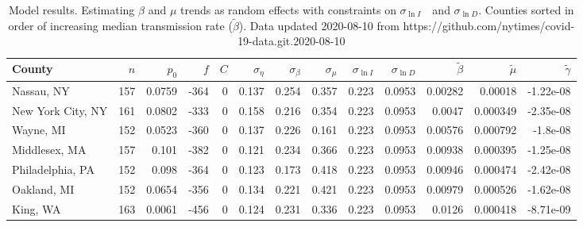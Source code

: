 \documentclass[12pt,letterpaper]{article}
\newcommand\slI{$\sigma_{\ln I}$\ }
\newcommand\slD{$\sigma_{\ln D}$}
\begin{document}
{\begin{appendices}
\begin{sidewaystable}
{%
}\end{sidewaystable}




\begin{sidewaystable}
\caption{\label{tab:cons}
Model results. Estimating $\beta$ and $\mu$ trends as random effects with 
constraints on \slI\  and \slD.
Counties sorted in order of increasing median transmission rate ($\tilde\beta$).
Data updated 2020-08-10 from https://github.com/nytimes/covid-19-data.git.2020-08-10
}
\centering
{\scriptsize

\begin{tabular}{lrrrrrrrrrrrr}
\hline
 County             &   $n$ &   $p_0$ &    $f$ &   $C$ &   $\sigma_\eta$ &   $\sigma_\beta$ &   $\sigma_\mu$ &   $\sigma_{\ln I}$ &   $\sigma_{\ln D}$ &   $\tilde{\beta}$ &   $\tilde{\mu}$ &   $\tilde\gamma$ \\
\hline
 Nassau, NY         & 157   & 0.0759  & -364   &     0 &          0.137  &           0.254  &         0.357  &              0.223 &             0.0953 &           0.00282 &        0.00018  &       -1.22e-08  \\
 New York City, NY  & 161   & 0.0802  & -333   &     0 &          0.158  &           0.216  &         0.354  &              0.223 &             0.0953 &           0.0047  &        0.000349 &       -2.35e-08  \\
 Wayne, MI          & 152   & 0.0523  & -360   &     0 &          0.137  &           0.226  &         0.161  &              0.223 &             0.0953 &           0.00576 &        0.000792 &       -1.8e-08   \\
 Middlesex, MA      & 157   & 0.101   & -382   &     0 &          0.121  &           0.234  &         0.366  &              0.223 &             0.0953 &           0.00938 &        0.000395 &       -1.25e-08  \\
 Philadelphia, PA   & 152   & 0.098   & -364   &     0 &          0.123  &           0.173  &         0.418  &              0.223 &             0.0953 &           0.00946 &        0.000474 &       -2.42e-08  \\
 Oakland, MI        & 152   & 0.0654  & -356   &     0 &          0.134  &           0.221  &         0.421  &              0.223 &             0.0953 &           0.00979 &        0.000526 &       -1.62e-08  \\
 King, WA           & 163   & 0.0061  & -456   &     0 &          0.124  &           0.231  &         0.336  &              0.223 &             0.0953 &           0.0126  &        0.000418 &       -8.71e-09  \\

\end{tabular}}
\end{sidewaystable}
\end{appendices}}
\end{document}

